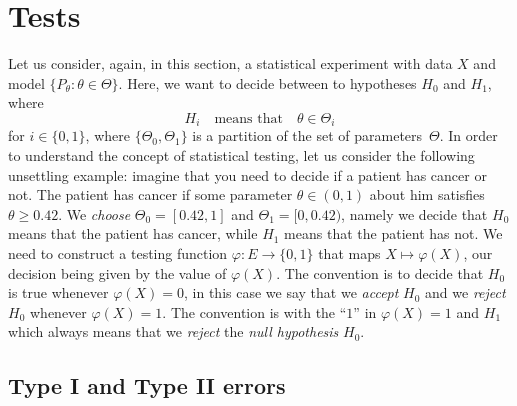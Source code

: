 \documentclass[
	fontsize=11pt, %
	twoside=false, %
	numbers=noenddot, %
]{kaobook}
\newcommand{\goes}{\rightarrow}
\begin{document}
\section{Tests} %
\label{sec:tests}

Let us consider, again, in this section, a statistical experiment with data $X$ and model $\{ P_\theta : \theta \in \Theta \}$.
Here, we want to decide between to hypotheses $H_0$ and $H_1$, where
\begin{equation*}
	H_i \quad \text{means that} \quad \theta \in \Theta_i
\end{equation*}
for $i \in \{ 0, 1 \}$, where $\{ \Theta_0, \Theta_1 \}$ is a partition of the set of parameters~$\Theta$.
In order to understand the concept of statistical testing, let us consider the following unsettling example: imagine that you need to decide if a patient has cancer or not.
The patient has cancer if some parameter $\theta \in (0, 1)$ about him satisfies
$\theta \geq 0.42$.
We \emph{choose} $\Theta_0 = [0.42, 1]$ and $\Theta_1 = [0, 0.42)$, namely we decide that $H_0$ means that the patient has cancer, while $H_1$ means that the patient has not.
We need to construct a testing function $\varphi : E \goes \{ 0, 1 \}$ that maps $X \mapsto \varphi(X)$, our decision being given by the value of $\varphi(X)$. 
The convention is to decide that $H_0$ is true whenever $\varphi(X) = 0$, in this case we say that we \emph{accept} $H_0$ and we \emph{reject} $H_0$ whenever $\varphi(X) = 1$.
The convention is with the ``$1$'' in $\varphi(X) = 1$ and $H_1$ which always means that we \emph{reject} the \emph{null hypothesis} $H_0$.

\subsection{Type I and Type II errors} %
\end{document}

